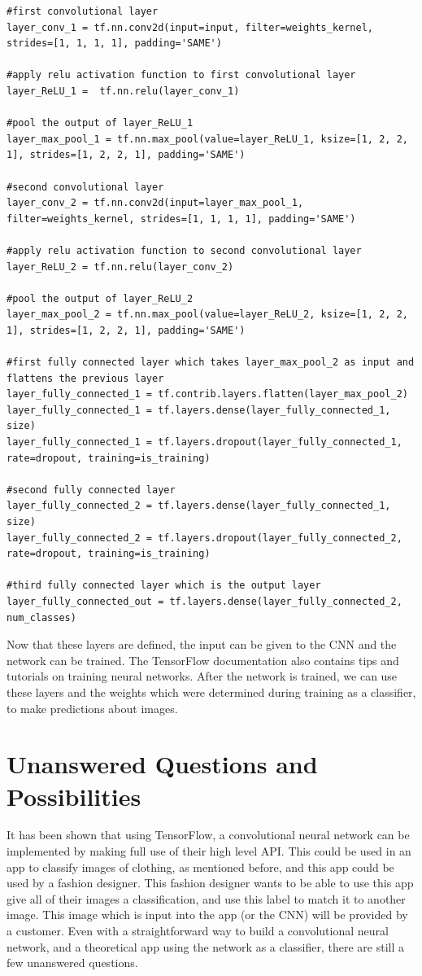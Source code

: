 \documentclass[12pt]{report} %
\begin{document}
\begin{verbatim}
#first convolutional layer
layer_conv_1 = tf.nn.conv2d(input=input, filter=weights_kernel, strides=[1, 1, 1, 1], padding='SAME')

#apply relu activation function to first convolutional layer
layer_ReLU_1 =  tf.nn.relu(layer_conv_1)

#pool the output of layer_ReLU_1
layer_max_pool_1 = tf.nn.max_pool(value=layer_ReLU_1, ksize=[1, 2, 2, 1], strides=[1, 2, 2, 1], padding='SAME')

#second convolutional layer
layer_conv_2 = tf.nn.conv2d(input=layer_max_pool_1, filter=weights_kernel, strides=[1, 1, 1, 1], padding='SAME')

#apply relu activation function to second convolutional layer
layer_ReLU_2 = tf.nn.relu(layer_conv_2)

#pool the output of layer_ReLU_2
layer_max_pool_2 = tf.nn.max_pool(value=layer_ReLU_2, ksize=[1, 2, 2, 1], strides=[1, 2, 2, 1], padding='SAME')

#first fully connected layer which takes layer_max_pool_2 as input and flattens the previous layer
layer_fully_connected_1 = tf.contrib.layers.flatten(layer_max_pool_2)
layer_fully_connected_1 = tf.layers.dense(layer_fully_connected_1, size)
layer_fully_connected_1 = tf.layers.dropout(layer_fully_connected_1, rate=dropout, training=is_training)

#second fully connected layer
layer_fully_connected_2 = tf.layers.dense(layer_fully_connected_1, size)
layer_fully_connected_2 = tf.layers.dropout(layer_fully_connected_2, rate=dropout, training=is_training)

#third fully connected layer which is the output layer
layer_fully_connected_out = tf.layers.dense(layer_fully_connected_2, num_classes)
\end{verbatim}

	Now that these layers are defined, the input can be given to the CNN and the network can be trained. The TensorFlow documentation also contains tips and tutorials on training neural networks\cite{tensorFlow}. After the network is trained, we can use these layers and the weights which were determined during training as a classifier, to make predictions about images.
	
\chapter{Unanswered Questions and Possibilities}
	It has been shown that using TensorFlow, a convolutional neural network can be implemented by making full use of their high level API. This could be used in an app to classify images of clothing, as mentioned before, and this app could be used by a fashion designer. This fashion designer wants to be able to use this app give all of their images a classification, and use this label to match it to another image. This image which is input into the app (or the CNN) will be provided by a customer. Even with a straightforward way to build a convolutional neural network, and a theoretical app using the network as a classifier, there are still a few unanswered questions.
	
\end{document}
